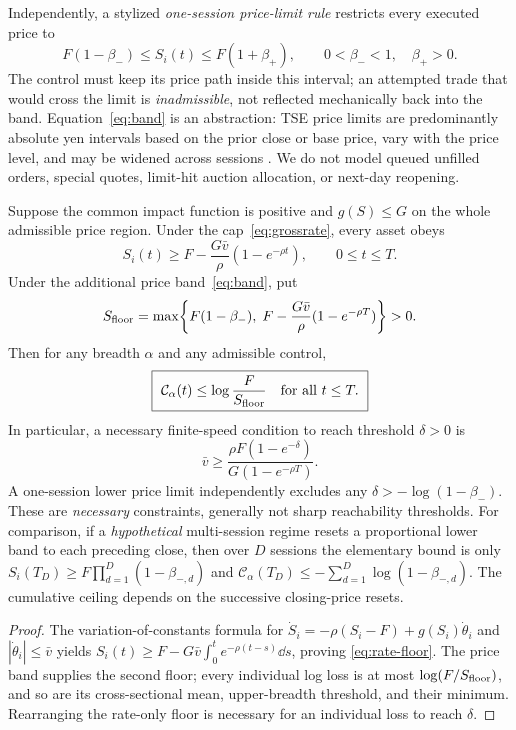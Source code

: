 \documentclass[review,hidelinks,onefignum,onetabnum]{siamonline250211}
\begin{document}
Independently, a stylized \emph{one-session price-limit rule} restricts every executed price to
\begin{equation}\label{eq:band}
 F(1-\beta_-)\le S_i(t)\le F(1+\beta_+),\qquad
 0<\beta_-<1,\quad\beta_+>0.
\end{equation}
The control must keep its price path inside this interval; an attempted trade that would cross the limit is \emph{inadmissible}, not reflected mechanically back into the band. Equation~\eqref{eq:band} is an abstraction: TSE price limits are predominantly absolute yen intervals based on the prior close or base price, vary with the price level, and may be widened across sessions \citep{JPX2026}. We do not model queued unfilled orders, special quotes, limit-hit auction allocation, or next-day reopening.

\begin{proposition}\label{prop:rate-band}
Suppose the common impact function is positive and $g(S)\le G$ on the whole admissible price region. Under the cap~\eqref{eq:grossrate}, every asset obeys
\begin{equation}\label{eq:rate-floor}
 S_i(t)\ge F-\frac{G\bar v}{\rho}(1-e^{-\rho t}),\qquad 0\le t\le T.
\end{equation}
Under the additional price band~\eqref{eq:band}, put
\begin{equation}\label{eq:twofloors}
 S_{\rm floor}=\max\!\left\{F(1-\beta_-),\;F-\frac{G\bar v}{\rho}(1-e^{-\rho T})\right\}>0.
\end{equation}
Then for any breadth $\alpha$ and any admissible control,
\begin{equation}\label{eq:constrained-crisis}
\boxed{\ \mathcal C_\alpha(t)\le \log\frac{F}{S_{\rm floor}}\quad\hbox{for all }t\le T.\ }
\end{equation}
In particular, a necessary finite-speed condition to reach threshold $\delta>0$ is
\begin{equation}\label{eq:min-speed}
\boxed{\ \bar v\ge\frac{\rho F(1-e^{-\delta})}{G(1-e^{-\rho T})}.\ }
\end{equation}
A one-session lower price limit independently excludes any $\delta> -\log(1-\beta_-)$. These are \emph{necessary} constraints, generally not sharp reachability thresholds. For comparison, if a \emph{hypothetical} multi-session regime resets a proportional lower band to each preceding close, then over $D$ sessions the elementary bound is only
$S_i(T_D)\ge F\prod_{d=1}^D(1-\beta_{-,d})$ and
$\mathcal C_\alpha(T_D)\le-\sum_{d=1}^D\log(1-\beta_{-,d})$.
The cumulative ceiling depends on the successive closing-price resets.
\end{proposition}
\begin{proof}
The variation-of-constants formula for $\dot S_i=-\rho(S_i-F)+g(S_i)\dot\theta_i$ and $|\dot\theta_i|\le\bar v$ yields $S_i(t)\ge F-G\bar v\int_0^t e^{-\rho(t-s)}\dd s$, proving \eqref{eq:rate-floor}. The price band supplies the second floor; every individual log loss is at most $\log(F/S_{\rm floor})$, and so are its cross-sectional mean, upper-breadth threshold, and their minimum. Rearranging the rate-only floor is necessary for an individual loss to reach $\delta$.
\end{proof}
\end{document}
